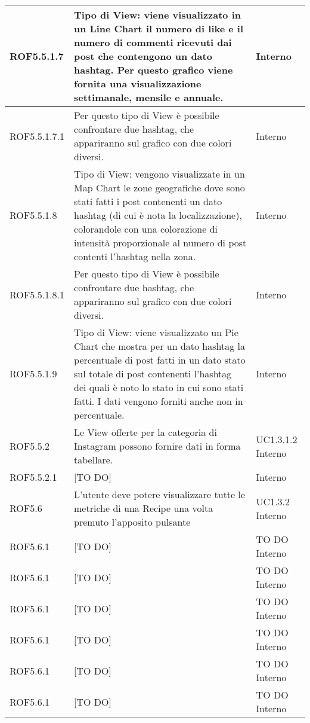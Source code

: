 \begin{center}
\begin{longtable}{| p{2.5cm} | p{8cm} | p{2cm} |}
		ROF5.5.1.7  &  Tipo di View: viene visualizzato in un Line Chart il numero di like e il numero di commenti ricevuti dai post che contengono un dato hashtag. Per questo grafico viene fornita una visualizzazione settimanale, mensile e annuale. & Interno \\
		\hline
		ROF5.5.1.7.1  &  Per questo tipo di View è possibile confrontare due hashtag, che appariranno sul grafico con due colori diversi. & Interno \\
		\hline
		ROF5.5.1.8  &  Tipo di View: vengono visualizzate in un Map Chart le zone geografiche dove sono stati fatti i post contenenti un dato hashtag (di cui è nota la localizzazione), colorandole con una colorazione di intensità proporzionale al numero di post contenti l'hashtag nella zona. & Interno \\
		\hline
		ROF5.5.1.8.1  &  Per questo tipo di View è possibile confrontare due hashtag, che appariranno sul grafico con due colori diversi. & Interno \\
		\hline
		ROF5.5.1.9  &  Tipo di View: viene visualizzato un Pie Chart che mostra per un dato hashtag la percentuale di post fatti in un dato stato sul totale di post contenenti l'hashtag dei quali è noto lo stato in cui sono stati fatti. I dati vengono forniti anche non in percentuale. & Interno \\
		\hline

		ROF5.5.2  & Le View offerte per la categoria di Instagram possono fornire dati in forma tabellare.  &  UC1.3.1.2 \newline Interno \\
		\hline
		ROF5.5.2.1  &  [TO DO] & Interno \\
		\hline

		ROF5.6  &  L'utente deve potere visualizzare tutte le metriche di una Recipe una volta premuto l'apposito pulsante  &  UC1.3.2 \newline Interno \\
		\hline
		ROF5.6.1  &  [TO DO]  &  TO DO \newline Interno \\
		\hline
		ROF5.6.1  &  [TO DO]  &  TO DO \newline Interno \\
		\hline
		ROF5.6.1  &  [TO DO]  &  TO DO \newline Interno \\
		\hline
		ROF5.6.1  &  [TO DO]  &  TO DO \newline Interno \\
		\hline
		ROF5.6.1  &  [TO DO]  &  TO DO \newline Interno \\
		\hline
		ROF5.6.1  &  [TO DO]  &  TO DO \newline Interno \\
		\hline





\end{longtable}
\end{center}
